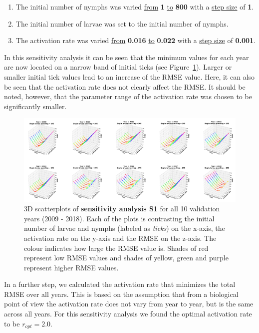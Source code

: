 \documentclass[a4paper, 11pt]{scrartcl}
\begin{document}
\begin{enumerate}
\item The initial number of nymphs was varied \underline{from} \textbf{1} \underline{to} \textbf{800} with a \underline{step size} of \textbf{1}.
\item The initial number of larvae was set to the initial number of nymphs.
\item The activation rate was varied \underline{from} \textbf{0.016} \underline{to} \textbf{0.022} with a \underline{step size} of \textbf{0.001}.
\end{enumerate}

In this sensitivity analysis it can be seen that the minimum values for each year are now located on a narrow band of initial ticks (see
Figure~\ref{fig:initial_ticks_with_beech_error}). Larger or smaller initial tick values lead to an increase of the RMSE value. Here, it can also be seen that the activation rate
does not clearly affect the RMSE. It should be noted, however, that the parameter range of the activation rate was chosen to be significantly smaller.

\begin{figure}[h!]
\centering
\includegraphics[width=\linewidth]{figures/initial_ticks_with_beech_error}
\caption{3D scatterplots of \textbf{sensitivity analysis S1} for all 10 validation years (2009 - 2018). Each of the plots is contrasting the initial number of larvae and nymphs
(labeled as \textit{ticks}) on the x-axis, the activation rate on the y-axis and the RMSE on the z-axis. The colour indicates how large the RMSE value is. Shades of red
represent low RMSE values and shades of yellow, green and purple represent higher RMSE values.}
\label{fig:initial_ticks_with_beech_error}
\end{figure}

In a further step, we calculated the activation rate that minimizes the total RMSE over all years. This is based on the assumption that from a biological point of view the
activation rate does not vary from year to year, but is the same across all years. For this sensitivity analysis we found the optimal activation rate to be $r_{opt} = 2.0$.
\end{document}
